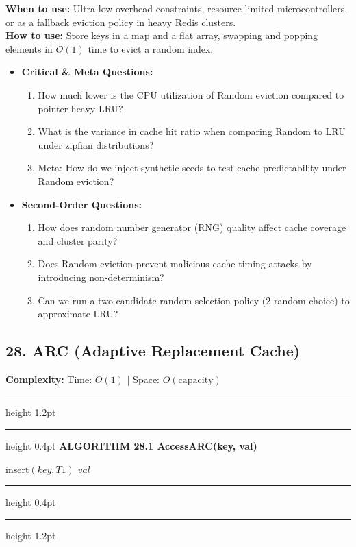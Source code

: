 \documentclass[11pt,a4paper]{article}
\newenvironment{textbookalgo}[2]{%
  \par\addvspace{1.2em}\noindent
  \hrule height 1.2pt
  \vspace{1.5pt}
  \hrule height 0.4pt
  \vspace{5pt}
  {\noindent\large\bfseries\sffamily ALGORITHM #1 \quad #2}
  \par\vspace{5pt}
  \RestyleAlgo{plain}
}{%
  \par\vspace{4pt}
  \hrule height 0.4pt
  \vspace{1.5pt}
  \hrule height 1.2pt
  \par\addvspace{1.2em}
}
\theoremstyle{definition}
\begin{document}
\noindent
\textbf{When to use:} Ultra-low overhead constraints, resource-limited microcontrollers, or as a fallback eviction policy in heavy Redis clusters.\\
\textbf{How to use:} Store keys in a map and a flat array, swapping and popping elements in $O(1)$ time to evict a random index.
\begin{itemize}[leftmargin=*]
  \item[] \textbf{Critical \& Meta Questions:}
  \begin{enumerate}
    \item How much lower is the CPU utilization of Random eviction compared to pointer-heavy LRU?
    \item What is the variance in cache hit ratio when comparing Random to LRU under zipfian distributions?
    \item Meta: How do we inject synthetic seeds to test cache predictability under Random eviction?
  \end{enumerate}
  \item[] \textbf{Second-Order Questions:}
  \begin{enumerate}
    \item How does random number generator (RNG) quality affect cache coverage and cluster parity?
    \item Does Random eviction prevent malicious cache-timing attacks by introducing non-determinism?
    \item Can we run a two-candidate random selection policy (2-random choice) to approximate LRU?
  \end{enumerate}
\end{itemize}
\medskip


\clearpage
\subsection{28. ARC (Adaptive Replacement Cache)}

\noindent
\textbf{Complexity:} Time: $O(1)$ | Space: $O(\text{capacity})$
\smallskip

\begin{textbookalgo}{28.1}{AccessARC(key, val)}
\begin{algorithm}[H]
$\text{insert}(key, T1)$\;
\Return $val$\;
\end{algorithm}
\end{textbookalgo}
\end{document}

